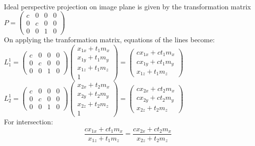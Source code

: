 \documentclass{article}
\begin{document}
	\\
	Ideal perspective projection on image plane is given by the transformation matrix \begin{math}P = \begin{pmatrix}c&0&0&0\\0&c&0&0\\0&0&1&0\end{pmatrix}\end{math}
	\\
	On applying the tranformation matrix, equations of the lines become:
	\\
	\begin{math}L_1^1 = \begin{pmatrix}c&0&0&0\\0&c&0&0\\0&0&1&0\end{pmatrix}\begin{pmatrix}x_{1x}+t_1m_x\\x_{1y}+t_1m_y\\x_{1z}+t_1m_z\\1\end{pmatrix} = \begin{pmatrix}cx_{1x}+ct_1m_x\\cx_{1y}+ct_1m_y\\x_{1z}+t_1m_z\end{pmatrix}\end{math}
	\\
	\begin{math}L_2^1 = \begin{pmatrix}c&0&0&0\\0&c&0&0\\0&0&1&0\end{pmatrix}\begin{pmatrix}x_{2x}+t_2m_x\\x_{2y}+t_2m_y\\x_{2z}+t_2m_z\\1\end{pmatrix} = \begin{pmatrix}cx_{2x}+ct_2m_x\\cx_{2y}+ct_2m_y\\x_{2z}+t_2m_z\end{pmatrix}\end{math}
	\\
	For intersection:
	\\
	\begin{equation}\frac{cx_{1x}+ct_1m_x}{x_{1z}+t_1m_z} = \frac{cx_{2x}+ct_2m_x}{x_{2z}+t_2m_z}\end{equation}
\end{document}
